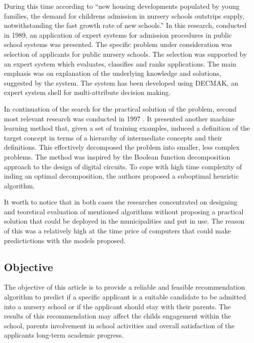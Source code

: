 During this time according to \citep{olave1989application} ``new housing
developments populated by young families, the demand for childrens
admission in nursery schools outstrips supply, notwithstanding the fast
growth rate of new schools.'' In this research, conducted in 1989, an
application of expert systems for admission procedures in public school
systems was presented. The specific problem under consideration was
selection of applicants for public nursery schools. The selection was
supported by an expert system which evaluates, classifies and ranks
applications. The main emphasis was on explanation of the underlying
knowledge and solutions, suggested by the system. The system has been
developed using DECMAK, an expert system shell for multi-attribute
decision making.

In continuation of the search for the practical solution of the problem,
second most relevant research was conducted in 1997
\citep{zupan1997machine}. It presented another machine learning method
that, given a set of training examples, induced a definition of the
target concept in terms of a hierarchy of intermediate concepts and
their definitions. This effectively decomposed the problem into smaller,
less complex problems. The method was inspired by the Boolean function
decomposition approach to the design of digital circuits. To cope with
high time complexity of inding an optimal decomposition, the authors
proposed a suboptimal heuristic algorithm.

It worth to notice that in both cases the researches concentrated on
designing and teoretical evaluation of mentioned algorithms without
proposing a practical solution that could be deployed in the
municipalities and put in use. The reason of this was a relatively high
at the time price of computers that could make predictictions with the
models proposed.

\hypertarget{objective}{%
\subsection{Objective}\label{objective}}

The objective of this article is to provide a reliable and feasible
recommendation algorithm to predict if a specific applicant is a
suitable candidate to be admitted into a nursery school or if the
applicant should stay with their parents. The results of this
recommendation may affect the childs engagement within the school,
parents involvement in school activities and overall satisfaction of the
applicants long-term academic progress.

